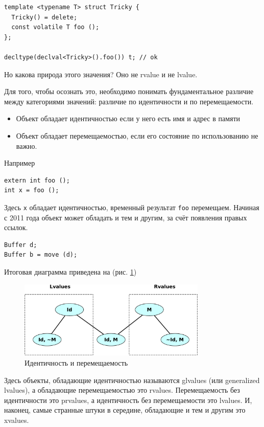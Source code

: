 \documentclass[a4paper,12pt,oneside]{article}
\begin{document}
\begin{lstlisting}
template <typename T> struct Tricky {
  Tricky() = delete;
  const volatile T foo ();
};

decltype(declval<Tricky>().foo()) t; // ok
\end{lstlisting}

Но какова природа этого значения? Оно не rvalue и не lvalue.

Для того, чтобы осознать это, необходимо понимать фундаментальное различие между категориями значений: различие по идентичности и по перемещаемости.

\begin{itemize}
\item Объект обладает идентичностью если у него есть имя и адрес в памяти
\item Объект обладает перемещаемостью, если его состояние по использованию не важно.
\end{itemize}

Например

\begin{lstlisting}
extern int foo ();
int x = foo (); 
\end{lstlisting}

Здесь \lstinline!x! обладает идентичностью, временный результат \lstinline!foo! перемещаем.
Начиная с 2011 года объект может обладать и тем и другим, за счёт появления правых ссылок.

\begin{lstlisting}
Buffer d;
Buffer b = move (d);
\end{lstlisting}

Итоговая диаграмма приведена на (рис. \ref{fig:rvref-identity})

\begin{figure}[ht]
\centering
\includegraphics[width=0.8\textwidth]{illustrations/rvref-identity-crop.pdf}
\caption{Идентичность и перемещаемость}
\label{fig:rvref-identity}
\end{figure}

Здесь объекты, обладающие идентичностью называются glvalues (или generalized lvalues), а обладающие  перемещаемостью это rvalues. Перемещаемость без идентичности это prvalues, а идентичность без перемещаемости это lvalues. И, наконец, самые странные штуки в середине, обладающие и тем и другим это xvalues.
\end{document}
